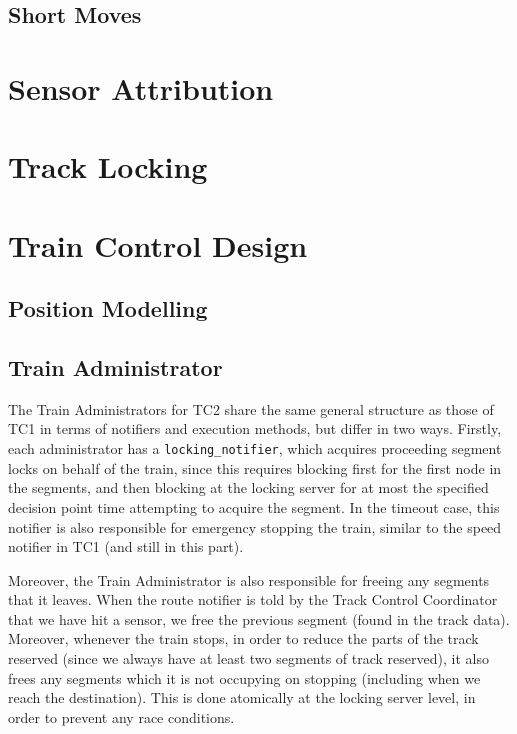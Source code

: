 \documentclass[12pt, titlepage]{article}
\begin{document}
    \subsection{Short Moves}
    \label{sec:short-moves}
    
    \section{Sensor Attribution}
    
    \section{Track Locking}
    \label{sec:locking}
    
    
    \section{Train Control Design}
    
    \subsection{Position Modelling}
    
    \subsection{Train Administrator}
    \label{sec:train}
    
    The Train Administrators for TC2 share the same general structure as those of TC1 in terms of notifiers and execution methods, but differ in two ways. Firstly, each administrator has a \verb`locking_notifier`, which acquires proceeding segment locks on behalf of the train, since this requires blocking first for the first node in the segments, and then blocking at the locking server for at most the specified decision point time attempting to acquire the segment. In the timeout case, this notifier is also responsible for emergency stopping the train, similar to the speed notifier in TC1 (and still in this part).
    
    Moreover, the Train Administrator is also responsible for freeing any segments that it leaves. When the route notifier is told by the Track Control Coordinator that we have hit a sensor, we free the previous segment (found in the track data). Moreover, whenever the train stops, in order to reduce the parts of the track reserved (since we always have at least two segments of track reserved), it also frees any segments which it is not occupying on stopping (including when we reach the destination). This is done atomically at the locking server level, in order to prevent any race conditions.
    
\end{document}
